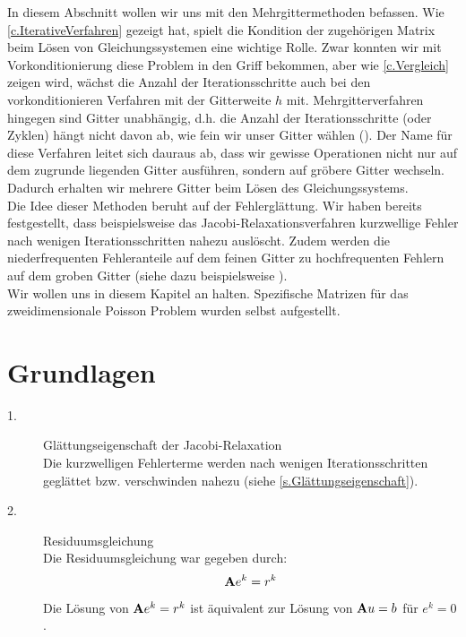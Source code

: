 In diesem Abschnitt wollen wir uns mit den Mehrgittermethoden befassen. Wie \autoref{c.IterativeVerfahren} gezeigt hat, spielt die Kondition der zugehörigen Matrix beim Lösen von Gleichungssystemen eine wichtige Rolle. Zwar konnten wir mit Vorkonditionierung diese Problem in den Griff bekommen, aber wie \autoref{c.Vergleich} zeigen wird, wächst die Anzahl der Iterationsschritte auch bei den vorkonditionieren Verfahren mit der Gitterweite $h$ mit. Mehrgitterverfahren hingegen sind Gitter unabhängig, d.h. die Anzahl der Iterationsschritte (oder Zyklen) hängt nicht davon ab, wie fein wir unser Gitter wählen (\cite{SAAD6}). Der Name für diese Verfahren leitet sich dauraus ab, dass wir gewisse Operationen nicht nur auf dem zugrunde liegenden Gitter ausführen, sondern auf gröbere Gitter wechseln. Dadurch erhalten wir mehrere Gitter beim Lösen des Gleichungssystems.\\
Die Idee dieser Methoden beruht auf der Fehlerglättung. Wir haben bereits festgestellt, dass beispielsweise das Jacobi-Relaxationsverfahren kurzwellige Fehler nach wenigen Iterationsschritten nahezu auslöscht. Zudem werden die niederfrequenten Fehleranteile auf dem feinen Gitter zu hochfrequenten Fehlern auf dem groben Gitter (siehe dazu beispielsweise \cite{STR}).\\
Wir wollen uns in diesem Kapitel an \cite{SAAD7} halten. Spezifische Matrizen für das zweidimensionale Poisson Problem wurden selbst aufgestellt.

\section{Grundlagen}\label{s.Idee MGM}

\begin{description}

\item[1.] Glättungseigenschaft der Jacobi-Relaxation \\
Die kurzwelligen Fehlerterme werden nach wenigen Iterationsschritten geglättet bzw. verschwinden nahezu (siehe \autoref{s.Glättungseigenschaft}).
\item[2.] Residuumsgleichung \\
Die Residuumsgleichung war gegeben durch:
\begin{equation}
{\textbf{A}} e^{k} = r^{k}
\end{equation}
Die Lösung von ${\textbf{A}} e^{k} = r^{k}$ ist äquivalent zur Lösung von ${\textbf{A}}u=b$ für $e^{k} = 0$.

\end{description}


